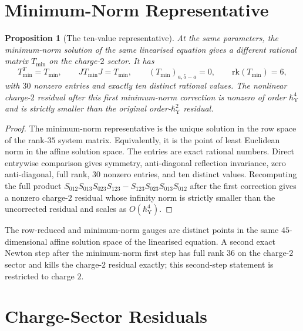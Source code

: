 \documentclass[11pt]{amsart}
\newtheorem{proposition}[theorem]{Proposition}
\theoremstyle{definition}
\theoremstyle{remark}
\newcommand{\rk}{\mathrm{rk}}
\begin{document}
\section{Minimum-Norm Representative}

\begin{proposition}[The ten-value representative]
\label{prop:minnorm-ten-values}
At the same parameters, the minimum-norm solution of the same
linearised equation gives a different rational matrix
$T_{\min}$ on the charge-$2$ sector.  It has
\[
  T_{\min}^T=T_{\min},\qquad JT_{\min}J=T_{\min},\qquad
  (T_{\min})_{a,5-a}=0,\qquad \rk(T_{\min})=6,
\]
with $30$ nonzero entries and exactly ten distinct rational values.
The nonlinear charge-$2$ residual after this first minimum-norm
correction is nonzero of order $\hbar_{\mathrm{Y}}^4$ and is strictly
smaller than the original order-$\hbar_{\mathrm{Y}}^2$ residual.
\end{proposition}

\begin{proof}
The minimum-norm representative is the unique solution in the row space
of the rank-$35$ system matrix.  Equivalently, it is the point of least
Euclidean norm in the affine solution space.  The entries are exact
rational numbers.  Direct entrywise comparison gives symmetry,
anti-diagonal reflection invariance, zero anti-diagonal, full rank, $30$
nonzero entries, and ten distinct values.  Recomputing the full product
$S_{012}S_{013}S_{023}S_{123}-S_{123}S_{023}S_{013}S_{012}$ after the
first correction gives a nonzero charge-$2$ residual whose infinity norm
is strictly smaller than the uncorrected residual and scales as
$O(\hbar_{\mathrm{Y}}^4)$.
\end{proof}

The row-reduced and minimum-norm gauges are distinct points in the same
$45$-dimensional affine solution space of the linearised equation.  A
second exact Newton step after the minimum-norm first step has full rank
$36$ on the charge-$2$ sector and kills the charge-$2$ residual exactly;
this second-step statement is restricted to charge $2$.

\section{Charge-Sector Residuals}
\end{document}
